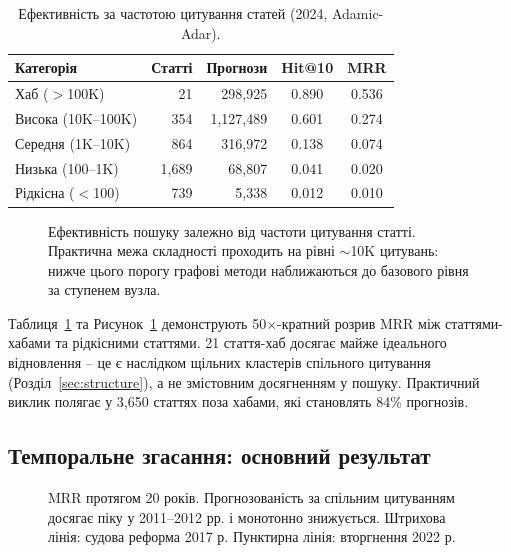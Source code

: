 \begin{table}[t]
\centering
\small
\caption{Ефективність за частотою цитування статей (2024, Adamic-Adar).}
\label{tab:difficulty}
\begin{tabular}{@{}l r r cc@{}}
\toprule
\textbf{Категорія} & \textbf{Статті} & \textbf{Прогнози} & \textbf{Hit@10} & \textbf{MRR} \\
\midrule
Хаб ($>$100K)     &    21 &  298{,}925 & 0.890 & 0.536 \\
Висока (10K--100K)  &   354 & 1{,}127{,}489 & 0.601 & 0.274 \\
Середня (1K--10K)     &   864 &  316{,}972 & 0.138 & 0.074 \\
Низька (100--1K)     & 1{,}689 &   68{,}807 & 0.041 & 0.020 \\
Рідкісна ($<$100)     &   739 &    5{,}338 & 0.012 & 0.010 \\
\bottomrule
\end{tabular}
\end{table}

\begin{figure}[t]
\centering

\caption{Ефективність пошуку залежно від частоти цитування статті. Практична межа складності проходить на рівні $\sim$10K цитувань: нижче цього порогу графові методи наближаються до базового рівня за ступенем вузла.}
\label{fig:difficulty}
\end{figure}

Таблиця~\ref{tab:difficulty} та Рисунок~\ref{fig:difficulty} демонструють 50$\times$-кратний розрив MRR між статтями-хабами та рідкісними статтями.
21 стаття-хаб досягає майже ідеального відновлення -- це є наслідком щільних кластерів спільного цитування (Розділ~\ref{sec:structure}), а не змістовним досягненням у пошуку.
Практичний виклик полягає у 3{,}650 статтях поза хабами, які становлять 84\% прогнозів.

\subsection{Темпоральне згасання: основний результат}

\begin{figure}[t]
\centering

\caption{MRR протягом 20 років. Прогнозованість за спільним цитуванням досягає піку у 2011--2012 рр. і монотонно знижується. Штрихова лінія: судова реформа 2017 р. Пунктирна лінія: вторгнення 2022 р.}
\label{fig:temporal}
\end{figure}

